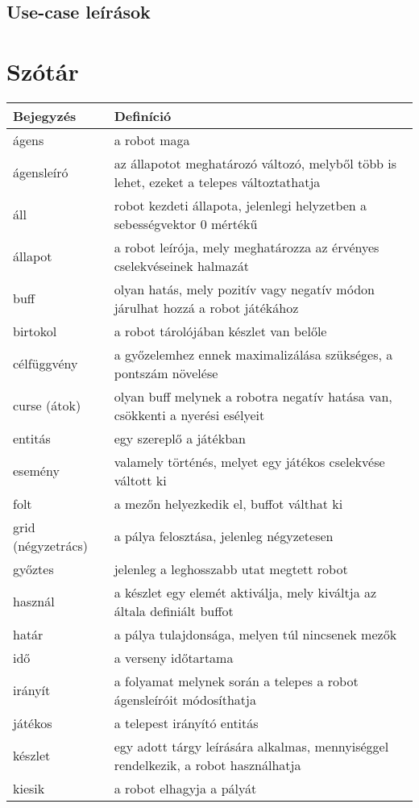 \subsection{Use-case leírások}



\section{Szótár}

\begin{tabularx}{\textwidth}{| l | l |}
\hline
\textbf{Bejegyzés} & \textbf{Definíció} \tabularnewline 
\hline\hline
    ágens & a robot maga \tabularnewline \hline
    ágensleíró &  az állapotot meghatározó változó, melyből több is lehet, ezeket a telepes változtathatja \tabularnewline \hline
    áll &  robot kezdeti állapota, jelenlegi helyzetben a sebességvektor 0 mértékű \tabularnewline \hline
    állapot &  a robot leírója, mely meghatározza az érvényes cselekvéseinek halmazát \tabularnewline \hline
    buff &  olyan hatás, mely pozitív vagy negatív módon járulhat hozzá a robot játékához \tabularnewline \hline
    birtokol & a robot tárolójában készlet van belőle \tabularnewline \hline
    célfüggvény & a győzelemhez ennek maximalizálása szükséges, a pontszám növelése  \tabularnewline \hline
    curse (átok) & olyan buff melynek a robotra negatív hatása van, csökkenti a nyerési esélyeit \tabularnewline \hline
    entitás &  egy szereplő a játékban \tabularnewline \hline 
    esemény & valamely történés, melyet egy játékos cselekvése váltott ki \tabularnewline \hline
    folt &  a mezőn helyezkedik el, buffot válthat ki \tabularnewline \hline
    grid (négyzetrács) & a pálya felosztása, jelenleg négyzetesen \tabularnewline \hline
    győztes &  jelenleg a leghosszabb utat megtett robot \tabularnewline \hline
    használ &  a készlet egy elemét aktiválja, mely kiváltja az általa definiált buffot \tabularnewline \hline
    határ &  a pálya tulajdonsága, melyen túl nincsenek mezők \tabularnewline \hline
    idő &  a verseny időtartama \tabularnewline \hline
    irányít &  a folyamat melynek során a telepes a robot ágensleíróit módosíthatja \tabularnewline \hline
    játékos &  a telepest irányító entitás \tabularnewline \hline
    készlet &  egy adott tárgy leírására alkalmas, mennyiséggel rendelkezik, a robot használhatja \tabularnewline \hline
    kiesik &  a robot elhagyja a pályát \tabularnewline \hline

\end{tabularx}
